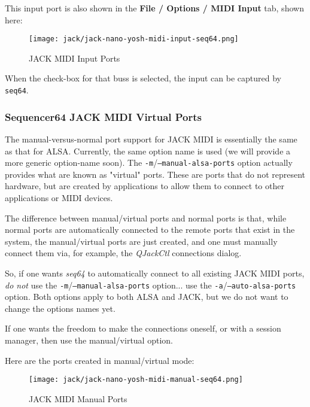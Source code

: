   This input port is also shown in the \textbf{File / Options / MIDI Input}
   tab, shown here:

\begin{figure}[H]
   \centering 
   \texttt{[image: jack/jack-nano-yosh-midi-input-seq64.png]}
   \caption{JACK MIDI Input Ports}
   \label{fig:seq64_jack_nano_yosh_midi_input}
\end{figure}

   When the check-box for that buss is selected, the input can be captured by
   \texttt{seq64}.

\subsubsection{Sequencer64 JACK MIDI Virtual Ports}
\label{subsubsec:seq64_jack_midi_virtual_ports}

   The manual-versus-normal port support for JACK MIDI is essentially the same
   as that for ALSA.  Currently, the same option name is used (we will provide
   a more generic option-name soon).
   The \texttt{-m}/\texttt{--manual-alsa-ports} option actually provides what
   are known as "virtual" ports.  These are ports that do not represent
   hardware, but are created by applications to allow them to connect to other
   applications or MIDI devices.

   The difference between manual/virtual ports and normal ports is that, while
   normal ports are automatically connected to the remote ports that exist in
   the system, the manual/virtual ports are just created, and one must
   manually connect them via, for example, the
   \textsl{QJackCtl} connections dialog.

   So, if one wants \textsl{seq64} to automatically connect to all existing
   JACK MIDI ports, \textsl{do not} use the
   \texttt{-m}/\texttt{--manual-alsa-ports} option... use the
   \texttt{-a}/\texttt{--auto-alsa-ports} option.  Both options apply to both
   ALSA and JACK, but we do not want to change the options names yet.

   If one wants the freedom to make the connections oneself, or with a session
   manager, then use the manual/virtual option.

   Here are the ports created in manual/virtual mode:

\begin{figure}[H]
   \centering 
   \texttt{[image: jack/jack-nano-yosh-midi-manual-seq64.png]}
   \caption{JACK MIDI Manual Ports}
   \label{fig:seq64_jack_nano_yosh_midi_manual}
\end{figure}

